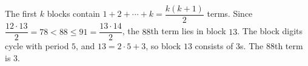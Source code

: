 The first $k$ blocks contain $1+2+\cdots+k=\dfrac{k(k+1)}{2}$ terms. Since $\dfrac{12\cdot13}{2}=78<88\le91=\dfrac{13\cdot14}{2}$, the $88$th term lies in block $13$. The block digits cycle with period $5$, and $13=2\cdot5+3$, so block $13$ consists of $3$s. The $88$th term is $\boxed{3}$.
